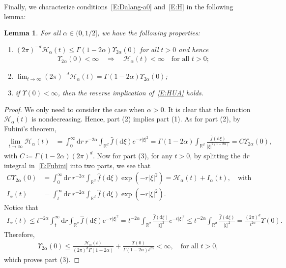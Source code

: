 \documentclass[a4paper,11pt]{article}%
\theoremstyle{plain}
\newtheorem{lemma}[theorem]{Lemma}
\theoremstyle{definition}
\numberwithin{equation}{section}
\newcommand{\R}{\mathbb{R}}
\newcommand{\ud}{\ensuremath{\mathrm{d}}}
\begin{document}
Finally, we characterize conditions~\eqref{E:Dalang-a0} and~\eqref{E:H} in the following lemma:

\begin{lemma}\label{L:HUA}
  For all $\alpha\in (0,1/2]$, we have the following properties:
  \begin{enumerate}[(1)]
  \item $\left(2\pi\right)^{-d}\mathcal{H}_\alpha(t)\le
    \Gamma\left(1-2\alpha\right)\Upsilon_{2\alpha}(0)$ for all $t>0$ and hence
    \begin{align}\label{E:HUA}
      \Upsilon_{2\alpha}(0)<\infty \quad \Longrightarrow \quad \mathcal{H}_\alpha(t)<\infty \quad \text{for
      all $t>0$};
    \end{align}
  \item $\lim_{t\to\infty}\left(2\pi\right)^{-d}\mathcal{H}_\alpha(t)= \Gamma\left(1-2\alpha\right)
    \Upsilon_{2\alpha}(0)$;
  \item if $\Upsilon(0)<\infty$, then the reverse implication of~\eqref{E:HUA} holds.
\end{enumerate}
\end{lemma}
\begin{proof}
  We only need to consider the case when $\alpha>0$. It is clear that the function
  $\mathcal{H}_\alpha(t)$ is nondecreasing. Hence, part (2) implies part (1). As for part (2), by
  Fubini's theorem,
  \begin{align}\label{E:Fubini}
    \lim_{t\to\infty}\mathcal{H}_\alpha(t)
    & = \int_0^\infty \ud r \: r^{-2\alpha} \int_{\R^d} \widehat{f}(\ud\xi)e^{-r|\xi|^2}
      = \Gamma(1-2\alpha) \int_{\R^d} \frac{\widehat{f}(\ud\xi)}{|\xi|^{2\left(1-2\alpha\right)}}
      = C \Upsilon_{2\alpha}(0),
  \end{align}
  with $C\coloneqq \Gamma(1-2\alpha)(2\pi)^d$. Now for part (3), for any $t>0$, by splitting the $\ud r$
  integral in~\eqref{E:Fubini} into two parts, we see that
  \begin{align*}
    C \Upsilon_{2\alpha}(0) & = \int_0^\infty \ud r \: r^{-2\alpha} \int_{\R^d} \widehat{f}(\ud\xi)\exp\left(-r|\xi|^2\right) = \mathcal{H}_\alpha(t) + I_\alpha(t), \quad \text{with} \\
    I_\alpha(t)             & = \int_t^\infty \ud r \: r^{-2\alpha} \int_{\R^d}
    \widehat{f}(\ud\xi)\exp\left(-r|\xi|^2\right).
  \end{align*}
  Notice that
  \begin{align*}
    I_\alpha(t) \le t^{-2\alpha} \int_t^\infty \ud r \int_{\R^d} \widehat{f}(\ud\xi)e^{-r|\xi|^2}
    = t^{-2\alpha} \int_{\R^d} \frac{\widehat{f}(\ud\xi)}{|\xi|^2} e^{-t|\xi|^2}
    \le t^{-2\alpha} \int_{\R^d} \frac{\widehat{f}(\ud\xi)}{|\xi|^2}
    = \frac{\left(2\pi\right)^d}{t^{2\alpha}} \Upsilon(0).
  \end{align*}
  Therefore,
  \begin{align*}
    \Upsilon_{2\alpha}(0) \le \frac{\mathcal{H}_\alpha(t)}{(2\pi)^d\Gamma(1-2\alpha)} +
    \frac{\Upsilon(0)}{\Gamma\left(1-2\alpha\right)t^{2\alpha}} <\infty, \quad \text{for all $t>0$,}
  \end{align*}
  which proves part (3).
\end{proof}
\end{document}
